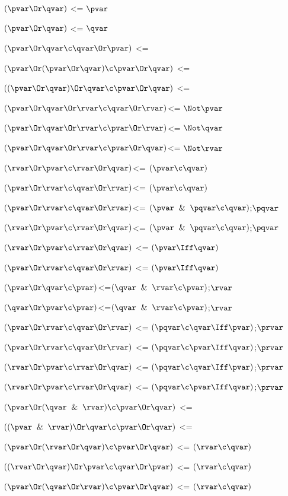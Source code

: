 $(\pvar \Or \qvar)$ <= $\pvar$

$(\pvar \Or \qvar)$ <= $\qvar$

$(\pvar \Or \qvar \c \qvar \Or \pvar)$ <=

$(\pvar \Or (\pvar \Or \qvar)\c \pvar \Or \qvar)$ <=

$((\pvar \Or \qvar) \Or \qvar \c \pvar \Or \qvar)$ <=

$( \pvar \Or \qvar \Or \rvar \c \qvar \Or \rvar)$<= $\Not \pvar$

$( \pvar \Or \qvar \Or \rvar \c \pvar \Or \rvar)$<= $\Not \qvar$

$( \pvar \Or \qvar \Or \rvar \c \pvar \Or \qvar)$<= $\Not \rvar$

$( \rvar \Or \pvar \c \rvar \Or \qvar)$<= $(\pvar\c \qvar)$

$(\pvar \Or \rvar \c \qvar \Or \rvar )$<= $(\pvar\c \qvar)$

$(\pvar \Or \rvar \c \qvar \Or \rvar)$<= $(\pvar \And \pqvar \c \qvar)$;$\pqvar$

$(\rvar \Or \pvar \c \rvar \Or \qvar)$<= $(\pvar \And \pqvar \c \qvar)$;$\pqvar$

$(\rvar \Or \pvar \c \rvar \Or \qvar)$ <= $(\pvar \Iff \qvar)$

$(\pvar \Or \rvar \c \qvar \Or \rvar)$ <= $(\pvar \Iff \qvar)$

$(\pvar \Or \qvar \c\pvar )$<=$(\qvar \And \rvar \c \pvar )$;$\rvar$

$(\qvar \Or \pvar \c\pvar )$<=$(\qvar \And \rvar \c \pvar )$;$\rvar$

$(\pvar  \Or \rvar \c \qvar \Or \rvar )$ <= $(\pqvar \c \qvar \Iff \pvar )$;$\prvar$

$(\pvar  \Or \rvar \c \qvar \Or \rvar )$ <= $(\pqvar \c \pvar \Iff \qvar )$;$\prvar$

$(\rvar  \Or \pvar \c \rvar \Or \qvar )$ <= $(\pqvar \c \qvar \Iff \pvar )$;$\prvar$

$(\rvar  \Or \pvar \c \rvar \Or \qvar )$ <= $(\pqvar \c \pvar \Iff \qvar )$;$\prvar$

$(\pvar \Or (\qvar \And \rvar) \c \pvar \Or \qvar)$ <=

$((\pvar \And \rvar) \Or \qvar \c \pvar \Or \qvar)$ <=

$(\pvar \Or (\rvar \Or \qvar) \c \pvar \Or \qvar)$ <= $(\rvar \c \qvar)$

$((\rvar \Or \qvar) \Or \pvar \c \qvar \Or \pvar)$ <= $(\rvar \c \qvar)$

$(\pvar \Or (\qvar \Or \rvar) \c \pvar \Or \qvar)$ <= $(\rvar \c \qvar)$

